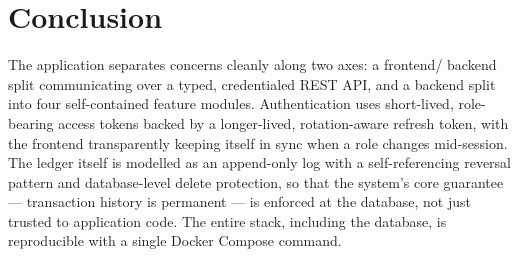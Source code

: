 \documentclass[11pt]{article}
\begin{document}
\section{Conclusion}

The application separates concerns cleanly along two axes: a frontend/
backend split communicating over a typed, credentialed REST API, and a
backend split into four self-contained feature modules. Authentication
uses short-lived, role-bearing access tokens backed by a longer-lived,
rotation-aware refresh token, with the frontend transparently keeping
itself in sync when a role changes mid-session. The ledger itself is
modelled as an append-only log with a self-referencing reversal pattern
and database-level delete protection, so that the system's core
guarantee --- transaction history is permanent --- is enforced at the
database, not just trusted to application code. The entire stack,
including the database, is reproducible with a single Docker Compose
command.
\end{document}

